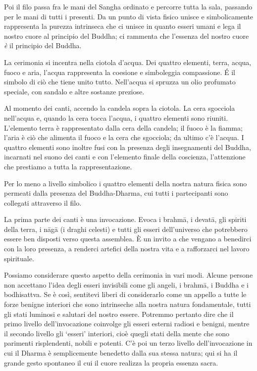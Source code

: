 Poi il filo passa fra le mani del Sangha ordinato e percorre tutta la sala, passando per le mani di tutti i presenti. Da un punto di vista fisico unisce e simbolicamente rappresenta la purezza intrinseca che ci unisce in quanto esseri umani e lega il nostro cuore al principio del Buddha; ci rammenta che l'essenza del nostro cuore \textit{è} il principio del Buddha.

La cerimonia si incentra nella ciotola d'acqua. Dei quattro elementi, terra, acqua, fuoco e aria, l'acqua rappresenta la coesione e simboleggia compassione. É il simbolo di ciò che tiene unito tutto. Nell'acqua si spruzza un olio profumato speciale, con sandalo e altre sostanze preziose.

Al momento dei canti, accendo la candela sopra la ciotola. La cera sgocciola nell'acqua e, quando la cera tocca l'acqua, i quattro elementi sono riuniti. L'elemento terra è rappresentato dalla cera della candela; il fuoco è la fiamma; l'aria è ciò che alimenta il fuoco e la cera che sgocciola; da ultimo c'è l'acqua. I quattro elementi sono inoltre fusi con la presenza degli insegnamenti del Buddha, incarnati nel suono dei canti e con l'elemento finale della coscienza, l'attenzione che prestiamo a tutta la rappresentazione.

Per lo meno a livello simbolico i quattro elementi della nostra natura fisica sono permeati dalla presenza del Buddha-Dharma, cui tutti i partecipanti sono collegati attraverso il filo.

La prima parte dei canti è una invocazione. Evoca i brahmā, i devatā, gli spiriti della terra, i nāgā (i draghi celesti) e tutti gli esseri dell'universo che potrebbero essere ben disposti verso questa assemblea. È un invito a che vengano a benedirci con la loro presenza, a renderci artefici della nostra vita e a rafforzarci nel lavoro spirituale.

Possiamo considerare questo aspetto della cerimonia in vari modi. Alcune persone non accettano l'idea degli esseri invisibili come gli angeli, i brahmā, i Buddha e i bodhisattva. Se è così, sentitevi liberi di considerarlo come un appello a tutte le forze benigne interiori che sono intrinseche alla nostra natura fondamentale, tutti gli stati luminosi e salutari del nostro essere. Potremmo pertanto dire che il primo livello dell'invocazione coinvolge gli esseri esterni radiosi e benigni, mentre il secondo livello gli `esseri' interiori, cioè quegli stati della mente che sono parimenti risplendenti, nobili e potenti. C'è poi un terzo livello dell'invocazione in cui il Dharma è semplicemente benedetto dalla sua stessa natura; qui si ha il grande gesto spontaneo il cui il cuore realizza la propria essenza sacra.

